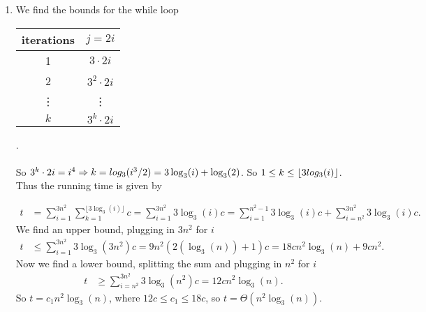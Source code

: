 \documentclass[10pt,oneside,reqno]{amsart}
\theoremstyle{plain}
\theoremstyle{definition}
\begin{document}
\begin{enumerate}[label=\arabic*.]
\begin{enumerate}
\item We find the bounds for the while loop\\
\begin{tabular}{c|c}
iterations & $j = 2i$\\
\hline
1 & $3 \cdot 2i$\\
2 & $3^2 \cdot 2i$\\
\vdots & \vdots\\
$k$ & $3^k \cdot 2i$
\end{tabular}.\\\\
So $3^k \cdot 2i = i^4 \Rightarrow k = \\log_3(i^3/2) = 3\log_3(i) + \log_3(2)$. So $1 \leq k \leq \lfloor 3\\log_3(i)\rfloor$. Thus the running time is given by

\begin{equation}
\begin{aligned}
t &= \sum_{i = 1}^{3n^2} \sum_{k = 1}^{\lfloor 3\log_3(i)\rfloor}c = \sum_{i = 1}^{3n^2} 3\log_3(i)c = \sum_{i = 1}^{n^2 - 1} 3\log_3(i)c + \sum_{i = n^2}^{3n^2} 3\log_3(i)c. 
\end{aligned}
\end{equation}
We find an upper bound, plugging in $3n^2$ for $i$
\begin{equation}
\begin{aligned}
t &\leq \sum_{i = 1}^{3n^2} 3\log_3(3n^2)c = 9n^2( 2(\log_3(n)) + 1)c = \boxed{18cn^2\log_3(n)} + 9cn^2. 
\end{aligned}
\end{equation}
Now we find a lower bound, splitting the sum and plugging in $n^2$ for $i$
\begin{equation}
\begin{aligned}
t &\geq \sum_{i = n^2}^{3n^2} 3\log_3(n^2)c = \boxed{12cn^2\log_3(n). }
\end{aligned}
\end{equation}
So $t = c_1n^2\log_3(n)$, where $12c \leq c_1 \leq 18c$, so $t = \boxed{\Theta(n^2\log_3(n)).}$


\end{enumerate}
\end{enumerate}
\end{document}
